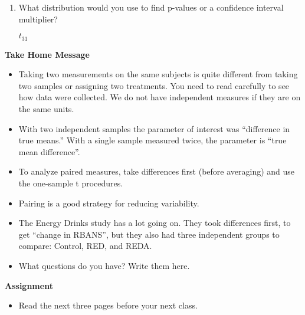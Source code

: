 \begin{enumerate}
\begin{enumerate}
\begin{key}
  {\it Take difference in weight gain (diet minus sugar) for each person.}
\end{key}
\item What distribution would you use to find p-values or
    a confidence interval multiplier?
\begin{students}
\vspace{2cm}\newpage
\end{students}

\begin{key}
  {\it $t_{31}$}
\end{key}
\end{enumerate}

\end{enumerate}


\begin{center}
  {\large\bf Take Home Message}
\end{center}
\begin{itemize}
\item Taking two measurements on the same subjects is quite different
  from taking two samples or assigning two treatments. You need to
  read carefully to see how data were collected.  We do not have
  independent measures if they are on the same units.

  \item With two independent samples the parameter of interest was
    ``difference in true means.''  With a single sample measured
    twice, the parameter is ``true mean difference''.

  \item To analyze paired measures, take differences first (before
    averaging) and use the one-sample t procedures.

  \item Pairing is a good strategy for reducing variability.

  \item The Energy Drinks study has a lot going on.  They took
    differences first, to get ``change in RBANS'', but they also had
    three independent groups to compare: Control, RED, and REDA.

  \item What  questions do you have?  Write them here.\vfill
\end{itemize}



\begin{center}
  {\large\bf Assignment}
\end{center}

\begin{itemize}
\item Read the next three pages before your next class.
\end{itemize}
